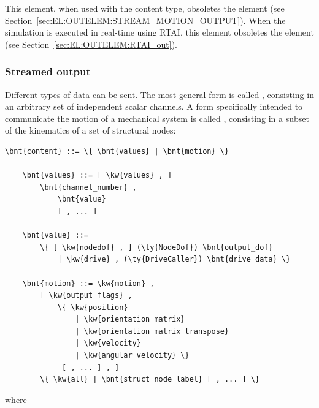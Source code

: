 This element, when used with the  content type,
obsoletes the  element
(see Section~\ref{sec:EL:OUTELEM:STREAM_MOTION_OUTPUT}).
When the simulation is executed in real-time using RTAI,
this element obsoletes the  element
(see Section~\ref{sec:EL:OUTELEM:RTAI_out}).



\subsubsection{Streamed output}
Different types of data can be sent.
The most general form is called , consisting
in an arbitrary set of independent scalar channels.
A form specifically intended to communicate the motion
of a mechanical system is called , consisting
in a subset of the kinematics of a set of structural nodes:
\begin{Verbatim}[commandchars=\\\{\}]
    \bnt{content} ::= \{ \bnt{values} | \bnt{motion} \}

    \bnt{values} ::= [ \kw{values} , ]
        \bnt{channel_number} ,
            \bnt{value}
            [ , ... ]

    \bnt{value} ::=
        \{ [ \kw{nodedof} , ] (\ty{NodeDof}) \bnt{output_dof}
            | \kw{drive} , (\ty{DriveCaller}) \bnt{drive_data} \}

    \bnt{motion} ::= \kw{motion} ,
        [ \kw{output flags} ,
            \{ \kw{position}
                | \kw{orientation matrix}
                | \kw{orientation matrix transpose}
                | \kw{velocity}
                | \kw{angular velocity} \}
             [ , ... ] , ]
        \{ \kw{all} | \bnt{struct_node_label} [ , ... ] \}
\end{Verbatim}
where
